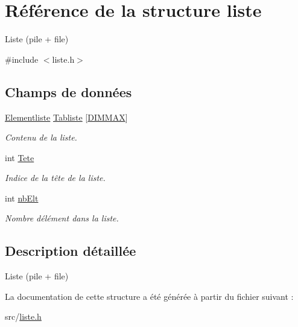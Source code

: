 \hypertarget{structliste}{}\section{Référence de la structure liste}
\label{structliste}


Liste (pile + file)  




{\ttfamily \#include $<$liste.\+h$>$}

\subsection*{Champs de données}
\begin{DoxyCompactItemize}
\item 
\mbox{\label{structliste_a5306c3d8ec2ffff7bc66e76132cc395e}} 
\mbox{\hyperlink{elementliste_8h_ad1cbc6cf883405e3e7ab3cd6e1451dbb}{Elementliste}} \mbox{\hyperlink{structliste_a5306c3d8ec2ffff7bc66e76132cc395e}{Tabliste}} \mbox{[}\mbox{\hyperlink{liste_8h_a5a724e718ea66e676efba2647aa56414}{D\+I\+M\+M\+AX}}\mbox{]}
\begin{DoxyCompactList}\small\item\em Contenu de la liste. \end{DoxyCompactList}\item 
\mbox{\label{structliste_ac27f6a14865441ed2e343acc6738aad2}} 
int \mbox{\hyperlink{structliste_ac27f6a14865441ed2e343acc6738aad2}{Tete}}
\begin{DoxyCompactList}\small\item\em Indice de la tête de la liste. \end{DoxyCompactList}\item 
\mbox{\label{structliste_ac6a9b89b3dd1181842948cdc6a1ee389}} 
int \mbox{\hyperlink{structliste_ac6a9b89b3dd1181842948cdc6a1ee389}{nb\+Elt}}
\begin{DoxyCompactList}\small\item\em Nombre d\textquotesingle{}élément dans la liste. \end{DoxyCompactList}\end{DoxyCompactItemize}


\subsection{Description détaillée}
Liste (pile + file) 

La documentation de cette structure a été générée à partir du fichier suivant \+:\begin{DoxyCompactItemize}
\item 
src/\mbox{\hyperlink{liste_8h}{liste.\+h}}\end{DoxyCompactItemize}

